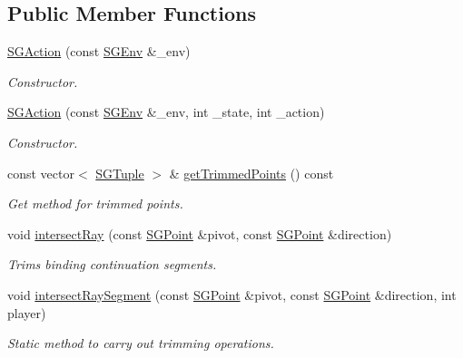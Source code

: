 \subsection*{Public Member Functions}
\begin{DoxyCompactItemize}
\item 
\hyperlink{classSGAction_a2beea431eab0f867e6bb678c8649c3e0}{S\+G\+Action} (const \hyperlink{classSGEnv}{S\+G\+Env} \&\+\_\+env)
\begin{DoxyCompactList}\small\item\em Constructor. \end{DoxyCompactList}\item 
\hyperlink{classSGAction_a763b30d91b4ac060895b3af2731d097c}{S\+G\+Action} (const \hyperlink{classSGEnv}{S\+G\+Env} \&\+\_\+env, int \+\_\+state, int \+\_\+action)
\begin{DoxyCompactList}\small\item\em Constructor. \end{DoxyCompactList}\item 
\mbox{\label{classSGAction_a89ed8a8129660d5b55319194c6a0e2c5}} 
const vector$<$ \hyperlink{classSGTuple}{S\+G\+Tuple} $>$ \& \hyperlink{classSGAction_a89ed8a8129660d5b55319194c6a0e2c5}{get\+Trimmed\+Points} () const
\begin{DoxyCompactList}\small\item\em Get method for trimmed points. \end{DoxyCompactList}\item 
void \hyperlink{classSGAction_a7ecafdb0cf42f83931f923f2e4e23f25}{intersect\+Ray} (const \hyperlink{classSGPoint}{S\+G\+Point} \&pivot, const \hyperlink{classSGPoint}{S\+G\+Point} \&direction)
\begin{DoxyCompactList}\small\item\em Trims binding continuation segments. \end{DoxyCompactList}\item 
void \hyperlink{classSGAction_ae78f31d121e131788ac4c767e01d012c}{intersect\+Ray\+Segment} (const \hyperlink{classSGPoint}{S\+G\+Point} \&pivot, const \hyperlink{classSGPoint}{S\+G\+Point} \&direction, int player)
\begin{DoxyCompactList}\small\item\em Static method to carry out trimming operations. \end{DoxyCompactList}\item 
\mbox{\label{classSGAction_a3c356d4fdf210ff3f0f62cdff8f6f257}} 

\end{DoxyCompactItemize}
